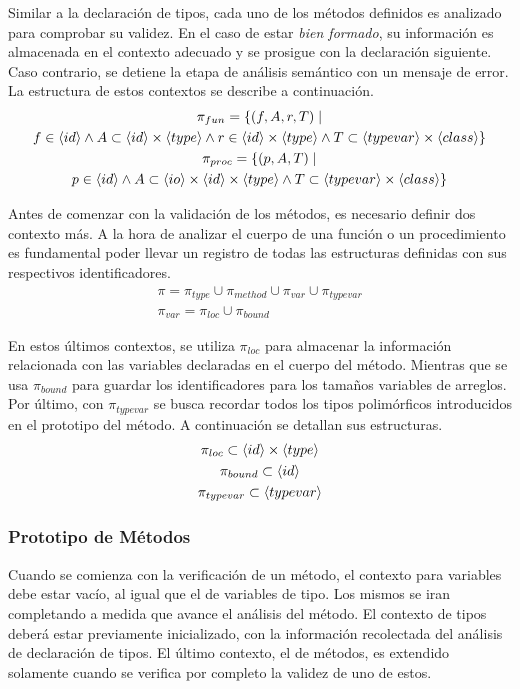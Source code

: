 \documentclass{article}
\begin{document}
Similar a la declaración de tipos, cada uno de los métodos definidos es analizado para comprobar su validez.
En el caso de estar \textit{bien formado}, su información es almacenada en el contexto adecuado y se prosigue con la declaración siguiente.
Caso contrario, se detiene la etapa de análisis semántico con un mensaje de error.
La estructura de estos contextos se describe a continuación.
\begin{gather*}
\pi_{fun} =
\{
(f, A, r, T) \mid
\\
f \in \langle id \rangle
\wedge
A \subset \langle id \rangle \times \langle type \rangle
\wedge
r \in \langle id \rangle \times \langle type \rangle
\wedge
T \subset \langle typevar \rangle \times \langle class \rangle
\}
\\
\pi_{proc} =
\{
(p, A, T) \mid
\\
p \in \langle id \rangle
\wedge
A \subset \langle io \rangle \times \langle id \rangle \times \langle type \rangle
\wedge
T \subset \langle typevar \rangle \times \langle class \rangle
\}
\end{gather*}

Antes de comenzar con la validación de los métodos, es necesario definir dos contexto más.
A la hora de analizar el cuerpo de una función o un procedimiento es fundamental poder llevar un registro de todas las estructuras definidas con sus respectivos identificadores.
\begin{gather*}
\pi = \pi_{type} \cup \pi_{method} \cup \pi_{var} \cup \pi_{typevar}
\\
\pi_{var} = \pi_{loc} \cup \pi_{bound}
\end{gather*}

En estos últimos contextos, se utiliza $\pi_{loc}$ para almacenar la información relacionada con las variables declaradas en el cuerpo del método.
Mientras que se usa $\pi_{bound}$ para guardar los identificadores para los tamaños variables de arreglos.
Por último, con $\pi_{typevar}$ se busca recordar todos los tipos polimórficos introducidos en el prototipo del método.
A continuación se detallan sus estructuras.
\begin{gather*}
\pi_{loc} \subset \langle id \rangle \times \langle type \rangle
\\
\pi_{bound} \subset \langle id \rangle
\\
\pi_{typevar} \subset \langle typevar \rangle
\end{gather*}

\subsubsection{Prototipo de Métodos}

Cuando se comienza con la verificación de un método, el contexto para variables debe estar vacío, al igual que el de variables de tipo.
Los mismos se iran completando a medida que avance el análisis del método.
El contexto de tipos deberá estar previamente inicializado, con la información recolectada del análisis de declaración de tipos.
El último contexto, el de métodos, es extendido solamente cuando se verifica por completo la validez de uno de estos.
\end{document}
